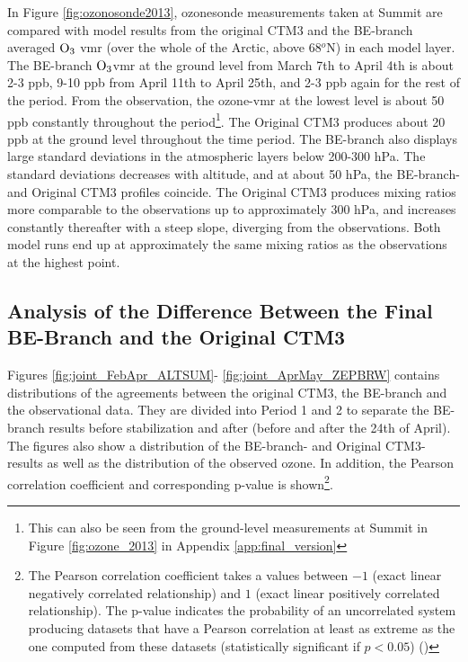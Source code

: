 In Figure \ref{fig:ozonosonde2013}, ozonesonde measurements taken at Summit are compared with model results from the original CTM3 and the BE-branch averaged $\mathrm{O_3}$ \acrshort{vmr} (over the whole of the Arctic, above 68$^o$N) in each model layer. The BE-branch $\mathrm{O_3}$\acrshort{vmr} at the ground level from March 7th to April 4th is about 2-3 ppb, 9-10 ppb from April 11th to April 25th, and 2-3 ppb again for the rest of the period. From the observation, the ozone-\acrshort{vmr} at the lowest level is about 50 ppb constantly throughout the period\footnote{This can also be seen from the ground-level measurements at Summit in Figure \ref{fig:ozone_2013} in Appendix \ref{app:final_version}}. The Original CTM3 produces about 20 ppb at the ground level throughout the time period. The BE-branch also displays large standard deviations in the atmospheric layers below 200-300 hPa. The standard deviations decreases with altitude, and at about 50 hPa, the BE-branch- and Original CTM3 profiles coincide. The Original CTM3 produces mixing ratios more comparable to the observations up to approximately 300 hPa, and increases constantly thereafter with a steep slope, diverging from the observations. Both model runs end up at approximately the same mixing ratios as the observations at the highest point.  




\clearpage



\subsection{Analysis of the Difference Between the Final BE-Branch and the Original CTM3}\label{sec:res_origBE} 

Figures \ref{fig:joint_FebApr_ALTSUM}- \ref{fig:joint_AprMay_ZEPBRW} contains distributions of the agreements between the original CTM3, the BE-branch and the observational data. They are divided into Period 1 and 2 to separate the BE-branch results before stabilization and after (before and after the 24th of April). The figures also show a distribution of the BE-branch- and Original CTM3-results as well as the distribution of the observed ozone. In addition, the Pearson correlation coefficient and corresponding p-value is shown\footnote{The Pearson correlation coefficient takes a values between $-1$ (exact linear negatively correlated relationship) and $1$ (exact linear positively correlated relationship). The p-value indicates the probability of an uncorrelated system producing datasets that have a Pearson correlation at least as extreme as the one computed from these datasets (statistically significant if $p<0.05$) (\cite{WILKS201123})}.

